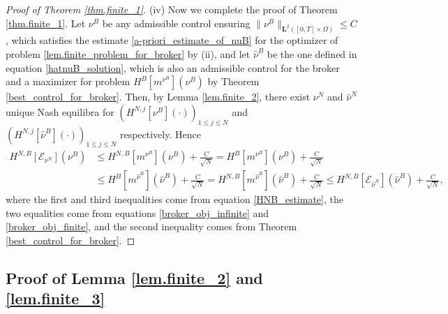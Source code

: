 \documentclass[10pt]{article}
\begin{document}
\begin{proof}[Proof of Theorem \ref{thm.finite_1}]
    (iv) Now we complete the proof of Theorem \ref{thm.finite_1}. Let $\nu^B$ be any admissible control ensuring $\|\nu^B\|_{\mathbf{L}^2([0,T] \times \Omega)} \leq C$, which satisfies the estimate \eqref{a-priori_estimate_of_nuB} for the optimizer of problem \eqref{lem.finite_problem_for_broker} by (ii), and let $\hat \nu^B$ be the one defined in equation \eqref{hatnuB_solution}, which is also an admissible control for the broker and a maximizer for problem $H^{B}[m^{\nu^B}] (\nu^B)$ by Theorem \ref{best_control_for_broker}. Then, by Lemma \ref{lem.finite_2}, there exist $\nu^N$ and $\hat \nu^N$ unique Nash equilibra for $(H^{N,j}[\nu^B](\cdot))_{1 \leq j \leq N}$ and $(H^{N,j}[\hat \nu^B](\cdot))_{1 \leq j \leq N}$ respectively. Hence
    \begin{align*}
        H^{N,B}\left[\mathcal{E}_{\nu^N}\right]\left(\nu^B\right) &\leq H^{N,B}\left[m^{\nu^B}\right]\left(\nu^B\right) + \frac{C}{\sqrt{N}} = H^{B}\left[m^{\nu^B}\right]\left(\nu^B\right) + \frac{C}{\sqrt{N}} \\
        & \leq H^{B}\left[m^{\hat \nu^B}\right]\left(\hat \nu^B\right) + \frac{C}{\sqrt{N}} = H^{N,B}\left[m^{\hat \nu^B}\right]\left(\hat \nu^B\right) + \frac{C}{\sqrt{N}} \leq H^{N,B}\left[\mathcal{E}_{\hat \nu^N}\right]\left(\hat \nu^B\right) + \frac{C}{\sqrt{N}},
    \end{align*}
    where the first and third inequalities come from equation \eqref{HNB_estimate}, the two equalities come from equations \eqref{broker_obj_infinite} and \eqref{broker_obj_finite}, and the second inequality comes from Theorem \ref{best_control_for_broker}.
\end{proof}


\subsection{Proof of Lemma \ref{lem.finite_2} and \ref{lem.finite_3}}
\end{document}
